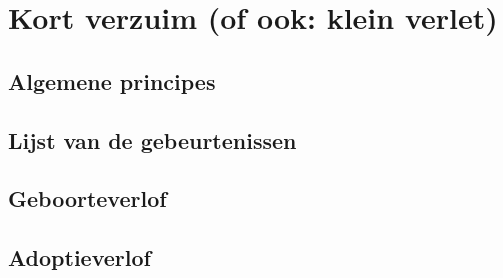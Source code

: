\section{Kort verzuim (of ook: klein verlet)}

\subsection{Algemene principes}

\subsection{Lijst van de gebeurtenissen}

\subsection{Geboorteverlof}

\subsection{Adoptieverlof}



